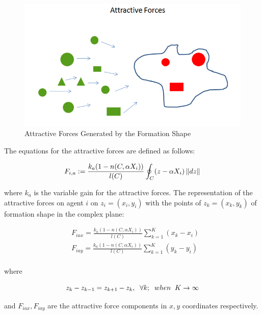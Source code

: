 \begin{figure}[H]
\caption{Attractive Forces Generated by the Formation Shape}
\centering
\includegraphics[scale = 0.60]{attractive_forces}
\end{figure}	

The equations for the attractive forces are defined as follows:			

\begin{equation}
F_{i,a} := \frac{k_a (1-n(C,\alpha X_i))}{l(C)} \oint_C(z-\alpha X_i)\left\lVert dz\right\rVert
\end{equation}

where $k_a$ is the variable gain for the attractive forces. The representation of the attractive forces on agent $i$ on $z_i = (x_i, y_i)$ with the points of  $z_k = (x_k,y_k)$ of formation shape in the complex plane:

\begin{align*}
& F_{iax} =\frac{k_a (1-n(C,\alpha X_i))}{l(C)}  \sum_{k=1}^{K} (x_k  - x_i)\\
& F_{iay} =\frac{k_a (1-n(C,\alpha X_i))}{l(C)}  \sum_{k=1}^{K} (y_k  - y_i)\\
\end{align*}
			
where

\begin{equation}
z_k - z_{k-1} = z_{k+1} - z_k, \hspace{0.2cm}  \forall k ;  \hspace{0.2cm} when  \hspace{0.2cm} K \to\infty
\end{equation}
			
and $F_{iax} , F_{iay} $ are the attractive force components in $x,y$ coordinates respectively.\newline
			
